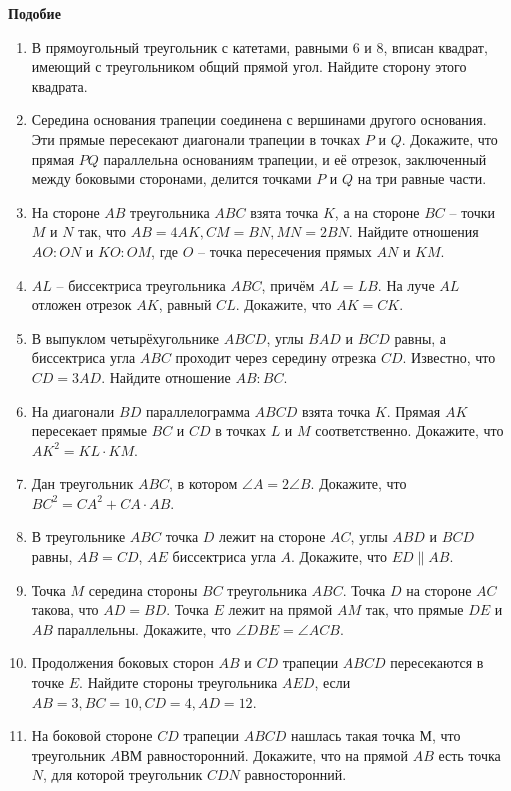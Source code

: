 \documentclass{article}
\begin{document}
\large


\begin{center}
\textbf{Подобие}
\end{center}

\begin{enumerate}[label*=\protect\fbox{\arabic{enumi}}]

\item В прямоугольный треугольник с катетами, равными 6 и 8, вписан квадрат, имеющий с треугольником общий прямой угол. Найдите сторону этого квадрата.


\item Середина основания трапеции соединена с вершинами другого основания. Эти прямые пересекают диагонали трапеции в точках $P$ и $Q$. Докажите, что прямая $PQ$ параллельна основаниям трапеции, и её отрезок, заключенный между боковыми сторонами, делится точками $P$ и $Q$ на три равные части.

\item На стороне $AB$ треугольника $ABC$ взята точка $K$, а на стороне $BC$ – точки $M$ и $N$ так, что $AB = 4AK, CM = BN, MN = 2BN$. Найдите отношения $AO:ON$ и $KO:OM$, где $O$ – точка пересечения прямых $AN$ и $KM$.

\item $AL$ – биссектриса треугольника $ABC$, причём $AL=LB$. На луче $AL$ отложен отрезок $AK$, равный $CL$. Докажите, что $AK=CK$.

\item В выпуклом четырёхугольнике $ABCD$, углы $BAD$ и $BCD$ равны, а биссектриса угла $ABC$ проходит через середину отрезка $CD$. Известно, что $CD = 3AD$. Найдите отношение $AB : BC$.

\item На диагонали $BD$ параллелограмма $ABCD$ взята точка $K$. Прямая $AK$ пересекает прямые $BC$ и $CD$ в точках $L$ и $M$ соответственно. Докажите, что $AK^2 =KL\cdot KM$.

\item Дан треугольник $ABC$, в котором $\angle A = 2\angle B$. Докажите, что $BC^2 = CA^2 + CA \cdot AB$.

\item В треугольнике $ABC$ точка $D$ лежит на стороне $AC$, углы $ABD$ и $BCD$ равны, $AB = CD$, $AE$ биссектриса угла $A$. Докажите, что $ED \parallel AB$.

\item Точка $M$ середина стороны $BC$ треугольника $ABC$. Точка $D$ на стороне $AC$ такова, что $AD = BD$. Точка $E$ лежит на прямой $AM$ так, что прямые $DE$ и $AB$ параллельны. Докажите, что $\angle DBE =  \angle ACB$.

\item Продолжения боковых сторон $AB$ и $CD$ трапеции $ABCD$ пересекаются в точке $E$. Найдите стороны треугольника $AED$, если
$AB = 3, BC = 10, CD = 4, AD = 12$.

\item На боковой стороне $CD$ трапеции $ABCD$ нашлась такая точка $М$, что треугольник $AВМ$ равносторонний. Докажите, что на прямой $AB$ есть точка $N$, для которой треугольник $CDN$ равносторонний.


\end{enumerate}
\end{document}
